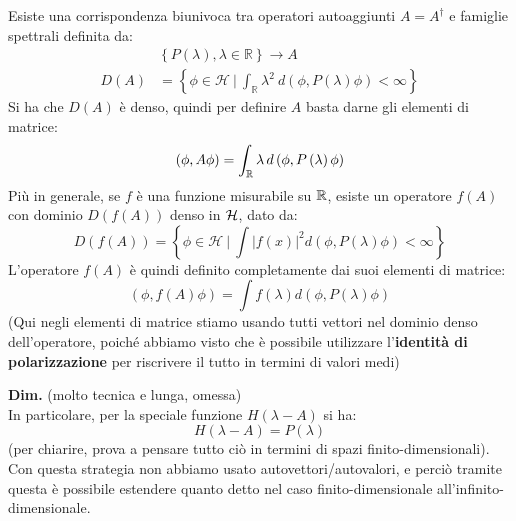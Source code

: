 \begin{thm}
Esiste una corrispondenza biunivoca tra operatori autoaggiunti $A=A^\dag$ e famiglie spettrali definita da:
\begin{align}
\nonumber &\left\{P\left(\lambda\right),\lambda\in\mathbb{R}\right\}\rightarrow A\\
D\left(A\right)&= \left\{\phi\in\mathcal{H}\ |\ \int_{\mathbb{R}}{\lambda^2\ d\left(\phi,P\left(\lambda\right)\phi\right)<\infty}\right\} 
\label{eqn:dominiofamigliaspettrale}
\end{align}
Si ha che $D(A)$ è denso, quindi per definire $A$ basta darne gli elementi di matrice:
\[
\left(\phi,A\phi\right)=\int_{\mathbb{R}} \lambda\, d\left(\phi,P\left(\lambda\right)\phi\right)
\]
Più in generale, se $f$ è una funzione misurabile su $\mathbb{R}$, esiste un operatore $f\left(A\right)$ con dominio $D(f(A))$ denso in $\mathcal{H}$, dato da:
\[
D\left(f\left(A\right)\right)= \left\{\phi\in\mathcal{H}\ |\ \int\left|f\left(x\right)\right|^2d\left(\phi,P\left(\lambda\right)\phi\right)<\infty\right\}
\]
L'operatore $f(A)$ è quindi definito completamente dai suoi elementi di matrice:
\[
\left(\phi,f\left(A\right)\phi\right)=\int f\left(\lambda\right) d(\phi , P\left(\lambda\right)\phi )
\]
(Qui negli elementi di matrice stiamo usando tutti vettori nel dominio denso dell'operatore, poiché abbiamo visto che è possibile utilizzare l'\textbf{identità di polarizzazione} per riscrivere il tutto in termini di valori medi)
\end{thm}
\textbf{Dim.} (molto tecnica e lunga, omessa)\\
In particolare, per la speciale funzione $H(\lambda-A)$ si ha:
\[
H(\lambda-A) = P(\lambda)
\]
(per chiarire, prova a pensare tutto ciò in termini di spazi finito-dimensionali).\\
Con questa strategia non abbiamo usato autovettori/autovalori, e perciò tramite questa è possibile estendere quanto detto nel caso finito-dimensionale all'infinito-dimensionale.

